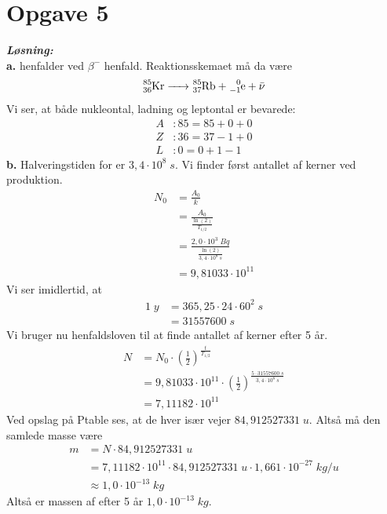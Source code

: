 \documentclass{report}
\newcommand{\sol}{\setlength{\parindent}{0cm}\textbf{\textit{Løsning:}}\setlength{\parindent}{1cm}}
\begin{document}
\section*{Opgave 5}
\sol \\
\textbf{a.}
 henfalder ved $\beta^-$ henfald. 
Reaktionsskemaet må da være 
\[
\ce{^85_36Kr -> ^85_37Rb + ^0_{-1}e + \bar{\nu}} 
\] 
Vi ser, at både nukleontal, ladning og leptontal er bevarede: 
\begin{equation*}
\begin{split}
  A&: 85=85+0+0\\ 
  Z&: 36=37-1+0 \\ 
  L&: 0=0+1-1
\end{split}
\end{equation*}
\textbf{b.}
Halveringstiden for  er $3,4 \cdot 10^8 \;\unit{s} $.
Vi finder først antallet af kerner ved produktion.
\begin{equation*}
\begin{split}
  N_0&=\frac{A_0}{k}\\ 
  &=\frac{A_0}{\frac{\ln (2)}{T_{1/2}}}\\ 
  &=\frac{2,0 \cdot 10^3 \;\unit{Bq} }{\frac{\ln(2)}{3,4 \cdot 10^8 \;\unit{s} }}\\ 
  &=9,81033 \cdot 10^{11} 
\end{split}
\end{equation*}
Vi ser imidlertid, at
\begin{equation*}
\begin{split}
  1 \;\unit{y} &= 365,25 \cdot 24 \cdot 60^2 \;\unit{s} \\ 
  &=31557600 \;\unit{s} 
\end{split}
\end{equation*}
Vi bruger nu henfaldsloven til at finde antallet af kerner efter 5 år. 
\begin{equation*}
\begin{split}
  N&=N_0 \cdot \left(\frac{1}{2}\right)^{\frac{t}{T_{1/2}}}\\ 
  &= 9,81033 \cdot 10^{11} \cdot \left(\frac{1}{2}\right)^{\frac{5 \cdot 31557600 \;\unit{s} }{3,4 \cdot 10^8 \;\unit{s} }}\\ 
  &=7,11182 \cdot 10^{11}
\end{split}
\end{equation*}
Ved opslag på Ptable ses, at de hver især vejer $84,912527331 \;\unit{u} $.
Altså må den samlede masse være 
\begin{equation*}
\begin{split}
  m&=N \cdot 84,912527331 \;\unit{u} \\ 
  &= 7,11182 \cdot 10^{11} \cdot 84,912527331 \;\unit{u} \cdot 1,661 \cdot 10^{-27} \;\unit{kg/u} \\ 
  &\approx 1,0 \cdot 10^{-13} \;\unit{kg} 
\end{split}
\end{equation*}
Altså er massen af  efter 5 år $1,0 \cdot 10^{-13} \;\unit{kg} $.
\end{document}
